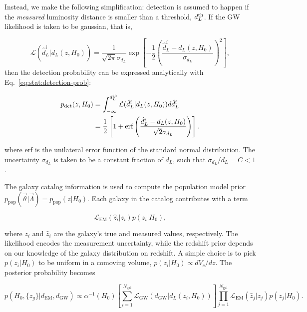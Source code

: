 \documentclass[%
preprint,
nofootinbib,
 amsmath,amssymb,
 aps,
]{revtex4-2}
\newcommand{\given}[2]{p( #1 | #2 )}
\newcommand{\ppop}[0]{p_{\text{pop}}}
\newcommand{\pdet}[0]{p_{\text{det}}}
\begin{document}
Instead, we make the following simplification: detection is assumed to happen if the
\textit{measured} luminosity distance is smaller than a threshold, $d_L^{\rm{th}}$. If the GW
likelihood is taken to be gaussian, that is,

\begin{equation}
	\label{eq:stat:gw-gaussian-likelihood}
	\mathcal{L}(\hat{d}_L^i | d_L(z, H_0))
	= \frac{1}{\sqrt{2 \pi} \sigma_{d_L}} \exp{\left [-\frac{1}{2} \left (\frac{\hat{d}_L^i - d_L(z, H_0)}{\sigma_{d_L}} \right )^2 \right ]},
\end{equation}
then the detection probability can be expressed analytically with Eq.~\eqref{eq:stat:detection-prob}:

\begin{align}
	\nonumber
	\pdet(z, H_0) & = \int_{-\infty}^{d_L^{\rm{th}}} \mathcal{L}(\hat{d}_L^i | d_L(z, H_0)) d \hat{d}_L^i                                    \\
	              & = \frac{1}{2} \left [ 1 + \text{erf} \left (\frac{\hat{d}_L^i - d_L(z, H_0)}{ \sqrt{2} \sigma_{d_L}}  \right ) \right ].
\end{align}

where erf is the unilateral error function of the standard normal distribution. The uncertainty
$\sigma_{d_L}$ is taken to be a constant fraction of $d_L$, such that $\sigma_{d_L} / d_L = C < 1$.

The galaxy catalog information is used to compute the population model prior $\ppop(\vec{\theta} |
	\vec{\Lambda}) = \ppop(z | H_0)$. Each galaxy in the catalog contributes with a term

\begin{equation}
	\mathcal{L}_\text{EM}(\hat{z}_i | z_i)p(z_i | H_0),
\end{equation}

where $z_i$ and $\hat{z}_i$ are the galaxy's true and measured values, respectively. The likelihood
encodes the measurement uncertainty, while the redshift prior depends on our knowledge of the
galaxy distribution on redshift. A simple choice is to pick $p(z_i | H_0)$ to be uniform in a
comoving volume, $p(z_i | H_0) \propto dV_c /dz$. The posterior probability becomes

\begin{equation}
	\label{eq:stat:full-redshift-posterior}
	\given{H_0, \{z_g\}}{d_\text{EM}, d_\text{GW}} \propto
	\alpha^{-1}(H_0) \left [ \sum_{i=1}^{N_\text{gal}} \mathcal{L}_\text{GW}(d_\text{GW} | d_L(z_i, H_0)) \right ]
	\prod_{j=1}^{N_\text{gal}} \mathcal{L}_\text{EM}(\hat{z}_j | z_j)p(z_j | H_0).
\end{equation}
\end{document}
